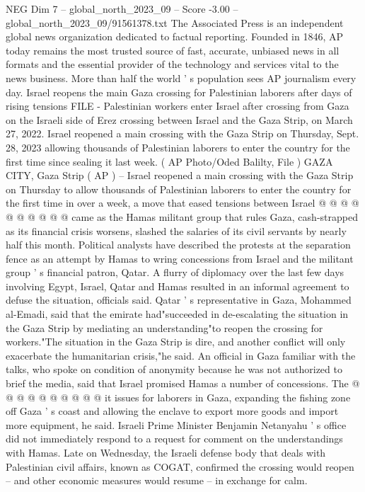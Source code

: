\begin{textsample}{NEG Dim 7 – global\_north\_2023\_09 – Score -3.00 – global\_north\_2023\_09/91561378.txt}  \label{ex:f7_neg_166}
The Associated Press is an independent global news organization dedicated to factual reporting.
Founded in 1846, AP today remains the most trusted source of fast, accurate, unbiased news in all formats and the essential provider of the technology and services vital to the news business.
More than half the world ' s population sees AP journalism every day.
Israel reopens the main Gaza crossing for Palestinian laborers after days of rising tensions FILE - Palestinian workers enter Israel after crossing from Gaza on the Israeli side of Erez crossing between Israel and the Gaza Strip, on March 27, 2022.
Israel reopened a main crossing with the Gaza Strip on Thursday, Sept. 28, 2023 allowing thousands of Palestinian laborers to enter the country for the first time since sealing it last week. ( AP Photo/Oded Balilty, File ) GAZA CITY, Gaza Strip ( AP ) -- Israel reopened a main crossing with the Gaza Strip on Thursday to allow thousands of Palestinian laborers to enter the country for the first time in over a week, a move that eased tensions between Israel @ @ @ @ @ @ @ @ @ @ came as the Hamas militant group that rules Gaza, cash-strapped as its financial crisis worsens, slashed the salaries of its civil servants by nearly half this month.
Political analysts have described the protests at the separation fence as an attempt by Hamas to wring concessions from Israel and the militant group ' s financial patron, Qatar.
A flurry of diplomacy over the last few days involving Egypt, Israel, Qatar and Hamas resulted in an informal agreement to defuse the situation, officials said.
Qatar ' s representative in Gaza, Mohammed al-Emadi, said that the emirate had"succeeded in de-escalating the situation in the Gaza Strip by mediating an understanding"to reopen the crossing for workers."The situation in the Gaza Strip is dire, and another conflict will only exacerbate the humanitarian crisis,"he said.
An official in Gaza familiar with the talks, who spoke on condition of anonymity because he was not authorized to brief the media, said that Israel promised Hamas a number of concessions.
The @ @ @ @ @ @ @ @ @ @ it issues for laborers in Gaza, expanding the fishing zone off Gaza ' s coast and allowing the enclave to export more goods and import more equipment, he said.
Israeli Prime Minister Benjamin Netanyahu ' s office did not immediately respond to a request for comment on the understandings with Hamas.
Late on Wednesday, the Israeli defense body that deals with Palestinian civil affairs, known as COGAT, confirmed the crossing would reopen -- and other economic measures would resume -- in exchange for calm.

\end{textsample}
